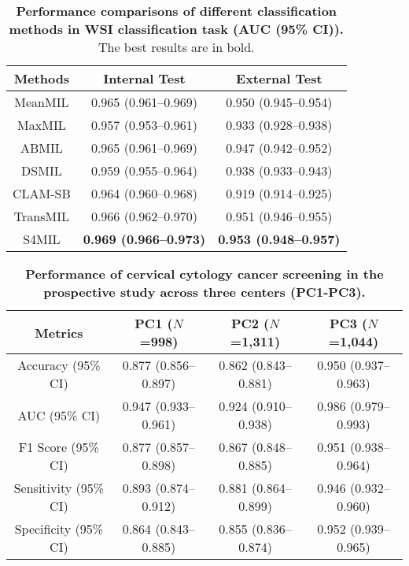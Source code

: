 \clearpage
\begin{table}[h] 
\renewcommand{\arraystretch}{2}
\renewcommand{\tablename}{Extended Data Table.}
\centering 
\caption{\textbf{Performance comparisons of different classification methods in WSI classification task (AUC (95\% CI)).} The best results are in bold.}
\begin{tabular}{c|cc} 
\hline
 \rowcolor{cusyellow} \textbf{Methods} & \textbf{Internal Test}  & \textbf{External Test} \\ 
\hline
MeanMIL & 0.965 (0.961–0.969)&0.950 (0.945–0.954) \\
 \rowcolor{cusyellowl} MaxMIL & 0.957 (0.953–0.961) &0.933 (0.928–0.938)\\
ABMIL \cite{ilse2018attention} & 0.965 (0.961–0.969) &0.947 (0.942–0.952) \\
 \rowcolor{cusyellowl} DSMIL \cite{li2021dual} & 0.959 (0.955–0.964) & 0.938 (0.933–0.943)  \\
CLAM-SB \cite{shao2021transmil} & 0.964 (0.960–0.968) & 0.919 (0.914–0.925) \\
 \rowcolor{cusyellowl}  TransMIL \cite{lu2021data} & 0.966 (0.962–0.970)  & 0.951 (0.946–0.955)\\
S4MIL \cite{fillioux2023structured} &\textbf{0.969 (0.966–0.973)} & \textbf{0.953 (0.948–0.957)}\\
\hline 
\end{tabular} 
\label{ST_clas}
\end{table}

\clearpage
\begin{table}[h] 
\renewcommand{\arraystretch}{2}
\renewcommand{\tablename}{Extended Data Table.}
\centering 
\caption{\textbf{Performance of cervical cytology cancer screening in the prospective study across three centers (PC1-PC3).}}
\begin{tabular}{c|ccc} 
\hline
 \rowcolor{cusyellow} \textbf{Metrics} & \textbf{PC1 ($N$=998)} & \textbf{PC2 ($N$=1,311)} & \textbf{PC3 ($N$=1,044)}\\ 
\hline
Accuracy (95\% CI) & 0.877 (0.856–0.897)&0.862 (0.843–0.881) &0.950 (0.937–0.963)\\
 \rowcolor{cusyellowl} AUC (95\% CI) &0.947 (0.933–0.961)   & 0.924 (0.910–0.938)& 0.986 (0.979–0.993) \\
F1 Score (95\% CI) & 0.877 (0.857–0.898) & 0.867 (0.848–0.885)   &0.951 (0.938–0.964)\\
 \rowcolor{cusyellowl} Sensitivity (95\% CI) &0.893 (0.874–0.912) & 0.881 (0.864–0.899) & 0.946 (0.932–0.960)\\
Specificity (95\% CI) &0.864 (0.843–0.885)& 0.855 (0.836–0.874)  &0.952 (0.939–0.965)\\

\hline 
\end{tabular} 
\label{ST_pros}
\end{table}


